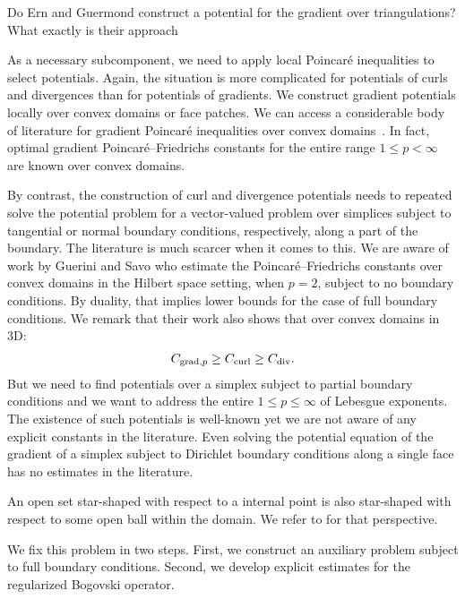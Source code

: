 \documentclass[a4paper]{article}
\begin{document}
\color{red}Do Ern and Guermond construct a potential for the gradient over triangulations? What exactly is their approach\color{black}
\nocite{gross2004electromagnetic,hiptmair2002finite}

As a necessary subcomponent, we need to apply local Poincar\'e inequalities to select potentials. 
Again, the situation is more complicated for potentials of curls and divergences than for potentials of gradients. 
We construct gradient potentials locally over convex domains or face patches. 
We can access a considerable body of literature for gradient Poincar\'e inequalities over convex domains~\cite{bebendorf2003note}. In fact, optimal gradient Poincar\'e--Friedrichs constants for the entire range $1 \leq p < \infty$ are known over convex domains. 

By contrast, the construction of curl and divergence potentials needs to repeated solve the potential problem for a vector-valued problem over simplices subject to tangential or normal boundary conditions, respectively, along a part of the boundary.
The literature is much scarcer when it comes to this. 
We are aware of work by Guerini and Savo who estimate the Poincar\'e--Friedrichs constants over convex domains in the Hilbert space setting, when $p=2$, subject to no boundary conditions.
By duality, that implies lower bounds for the case of full boundary conditions.
We remark that their work also shows that over convex domains in 3D:
\begin{align*}
    C_{\operatorname{grad},p} \geq C_{\operatorname{curl}} \geq C_{\operatorname{div}}.
\end{align*}
But we need to find potentials over a simplex subject to partial boundary conditions 
and we want to address the entire $1 \leq p \leq \infty$ of Lebesgue exponents. 
The existence of such potentials is well-known yet we are not aware of any explicit constants in the literature.
Even solving the potential equation of the gradient of a simplex subject to Dirichlet boundary conditions along a single face 
has no estimates in the literature. 

An open set star-shaped with respect to a internal point is also star-shaped with respect to some open ball within the domain.
We refer to \cite{hurri1988poincare} for that perspective.

We fix this problem in two steps. 
First, we construct an auxiliary problem subject to full boundary conditions.
Second, we develop explicit estimates for the regularized Bogovski operator. 


\end{document}

